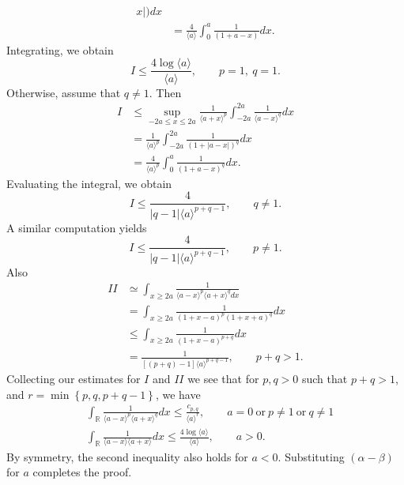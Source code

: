 \documentclass[12pt,reqno]{amsart}
\numberwithin{equation}{section}  %
\newcommand{\rr}{\mathbb{R}}
\begin{document}
\begin{appendices}
\begin{equation*}
\begin{split}
{  x
  |)} d x
  \\
  & = \frac{4}{\langle a \rangle} \int_{0}^{a} \frac{1}{(1 + a -
  x)} d x.
\end{split}
\end{equation*}
%
%
Integrating, we obtain
%
%
\begin{equation*}
 I
 \le 
 \frac{4 \log \langle a \rangle}{\langle a \rangle}, \qquad p =1, \ q =1.
\end{equation*}
Otherwise, assume that $q \neq 1$. Then
\begin{equation*}
\begin{split}
  I
  & \le \sup_{-2a \le x \le 2a} \frac{1}{\langle a + x \rangle
  ^{p}} \int_{-2a}^{2a} \frac{1}{\langle a - x \rangle ^{q}} d x
  \\
  & = \frac{1}{\langle a \rangle ^{p}} \int_{-2a}^{2a} \frac{1}{(1 + | a -
  x
  |)^{q}} d x
  \\
  & = \frac{4}{\langle a \rangle ^{p}} \int_{0}^{a} \frac{1}{(1 + a -
  x)^{q}} d x.
\end{split}
\end{equation*}
Evaluating the integral, we obtain
\begin{equation*}
  I \le \frac{4}{|q-1| \langle a \rangle ^{p +q -1}}, \qquad q \neq 1.
\end{equation*}
%
%
A similar computation yields
\begin{equation*}
  I \le \frac{4}{|q-1| \langle a \rangle ^{p +q -1}}, \qquad p \neq 1.
\end{equation*}
%
%
Also
%
%
\begin{equation*}
\begin{split}
  II 
  & \simeq \int_{x \ge 2a} \frac{1}{\langle a - x \rangle ^{p} \langle a
  + x \rangle ^{q} d x}
  \\ 
  & = \int_{x \ge 2a} \frac{1}{(1 + x - a)^{p} (1 + x +
  a)^{q}} d x
  \\
  & \le \int_{x \ge 2a} \frac{1}{(1 + x -a)^{p+q}} d x
  \\
  & = \frac{1}{[(p + q)-1] \langle a \rangle ^{p+q -1}}, \qquad p + q > 1.
\end{split}
\end{equation*}
%
%
Collecting our estimates for $I$ and $II$ we see that for 
$p, q > 0$ such that $p +q >1$, and $r =\min\left\{p, q, p+q-1
 \right\}$, we have 
%
\begin{align*}
  & \int_{\rr} \frac{1}{\langle a - x \rangle ^{p} \langle a + x \rangle
  ^{q}} d x
  \le \frac{c_{p,q}}{\langle a \rangle ^{r}}, \qquad a = 0 \ \text{or} \
  p \neq 1 \ \text{or} \ q \neq 1
  \\
  & \int_{\rr} \frac{1}{\langle a - x \rangle  \langle a + x \rangle
} d x
  \le  \frac{4 \log \langle a \rangle}{\langle a \rangle}, \qquad a > 0.
  \label{est-2}
\end{align*}
By symmetry, the second inequality also holds for $a < 0$. Substituting $(\alpha -
\beta)$ for $a$ completes the proof. \qquad \qedsymbol
%
%

\end{appendices}
\end{document}
